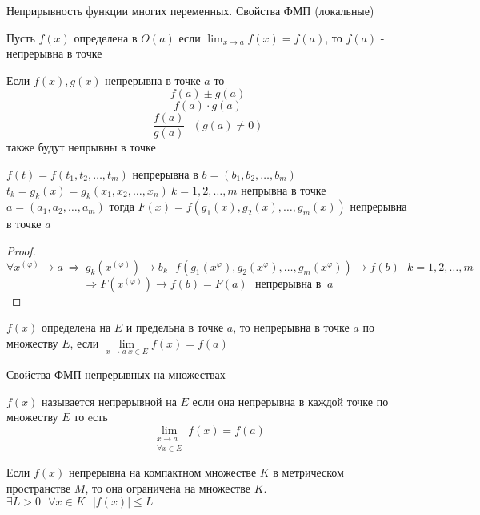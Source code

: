 \begin{title}[\Large]
  Неприрывность функции многих переменных. Свойства ФМП (локальные)
\end{title}

\begin{define}
  Пусть $f(x)$ определена в $O(a)$ если $\lim_{x \to a} f(x) = f(a)$, то
  $f(a)$ - непрерывна в точке
\end{define}

\begin{block}[Свойства]
  Если $f(x), g(x)$ непрерывна в точке $a$ то
  $$
  f(a) \pm g(a)
  $$
  $$
  f(a) \cdot g(a)
  $$
  $$
  \frac{f(a)}{g(a)} ~~~ (g(a) \not= 0)
  $$
  также будут непрывны в точке
\end{block}

\begin{theorem}
  $f(t) = f(t_1, t_2, \ldots, t_m)$ непрерывна в $b = (b_1, b_2, \ldots, b_m)$
  $t_k = g_k(x) = g_k(x_1, x_2, \ldots, x_n) ~ k = 1,2, \ldots, m$ непрывна в
  точке $a = (a_1, a_2, \ldots, a_m)$ тогда
  $F(x) = f(g_1(x), g_2(x), \ldots, g_m(x))$ непрерывна в
  точке $a$
\end{theorem}

\begin{proof}
  $$
  \forall x^{(\varphi)} \to a ~ \Rightarrow ~ g_k(x^{(\varphi)}) \to b_k ~~~
  f(g_1(x^{\varphi}), g_2(x^{\varphi}), \ldots, g_m(x^{\varphi})) \to f(b) ~~~
  k = 1,2, \ldots, m
  $$
  $$
  \Rightarrow F(x^{(\varphi)}) \to f(b) = F(a) ~~~ \text{непрерывна в } ~ a
  $$
\end{proof}

\begin{define}
  $f(x)$ определена на $E$ и предельна в точке $a$, то непрерывна в точке $a$
  по множеству $E$, если $\lim \limits_{x \to a ~ x \in E} f(x) = f(a)$
\end{define}

\begin{title}[\Large]
  Свойства ФМП непрерывных на множествах
\end{title}

\begin{define}
  $f(x)$ называется непрерывной на $E$ если она непрерывна в каждой точке по
  множеству $E$ то eсть
  $$
  \lim_{\substack{x \to a \\ \forall x \in E}} f(x) = f(a)
  $$
\end{define}

\begin{theorem}
  Если $f(x)$ непрерывна на компактном множестве $K$ в метрическом пространстве
  $M$, то она ограничена на множестве $K$. $\exists L > 0 ~~~
  \forall x \in K ~~~ |f(x)| \le L$
\end{theorem}

